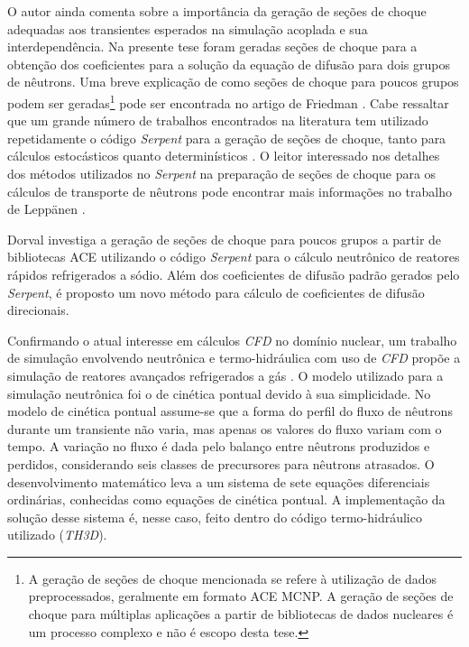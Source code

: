 O autor ainda comenta sobre a importância da geração de seções de choque adequadas aos transientes esperados na 
simulação acoplada e sua interdependência. Na presente tese foram geradas seções de choque para a obtenção dos
coeficientes para a solução da equação de difusão para dois grupos de nêutrons.
Uma breve explicação de como seções de choque para poucos grupos podem ser geradas\footnote{A geração de seções de choque mencionada
  se refere à utilização de dados preprocessados, geralmente em formato ACE MCNP. A geração de seções de choque
  para múltiplas aplicações a partir de bibliotecas de dados nucleares é um processo complexo e não é escopo
desta tese.} pode ser encontrada no
artigo de Friedman \cite{Friedman2013}. Cabe ressaltar que um grande número de trabalhos encontrados
na literatura tem utilizado repetidamente o código \textit{Serpent} \cite{Serpent2013} para
a geração de seções de choque, tanto para cálculos estocásticos quanto determinísticos \cite{Jareteg2014}. O leitor interessado nos detalhes dos métodos utilizados no \textit{Serpent} na
preparação de seções de choque para os cálculos de transporte de nêutrons pode encontrar mais informações no trabalho de Leppänen \cite{Leppanen2009}.

Dorval \cite{Dorval2015} investiga
a geração de seções de choque para poucos grupos a partir de bibliotecas ACE utilizando o código \textit{Serpent} para
o cálculo neutrônico de reatores rápidos refrigerados a sódio. Além dos coeficientes de
difusão padrão gerados pelo \textit{Serpent}, é proposto um novo método para cálculo de
coeficientes de difusão direcionais. 

Confirmando o atual interesse em cálculos \textit{CFD} no domínio nuclear, um trabalho de simulação envolvendo
neutrônica e termo-hidráulica com uso de \textit{CFD} propõe a simulação de reatores avançados refrigerados
a gás \cite{Hossain2011}. O modelo utilizado 
para a simulação neutrônica foi o de cinética pontual devido à sua simplicidade. No modelo 
de cinética pontual assume-se que a forma do perfil do fluxo de nêutrons durante um transiente 
não varia, mas apenas os valores do fluxo variam com o tempo. A variação no fluxo é dada 
pelo balanço entre nêutrons produzidos e perdidos, considerando seis classes de precursores 
para nêutrons atrasados. O desenvolvimento matemático leva a um sistema de sete equações diferenciais 
ordinárias, conhecidas como equações de cinética pontual. A implementação da solução desse sistema 
é, nesse caso, feito dentro do código termo-hidráulico utilizado (\textit{TH3D}).

